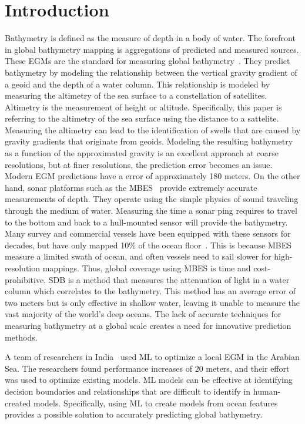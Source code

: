 \section{Introduction}
\setlength{\parindent}{10ex}
Bathymetry is defined as the measure of depth in a body of water.
The forefront in global bathymetry mapping is aggregations of predicted and measured sources. 
These \ac{EGM}s are the standard for measuring global bathymetry~\cite{becker2009global,smith1994bathymetric,smith1997global,smith2010planning}.
They predict bathymetry by modeling the relationship between the vertical gravity gradient of a geoid and the depth of a water column.
This relationship is modeled by measuring the altimetry of the sea surface to a constellation of satellites.
Altimetry is the measurement of height or altitude. 
Specifically, this paper is referring to the altimetry of the sea surface using the distance to a sattelite.
Measuring the altimetry can lead to the identification of swells that are caused by gravity gradients that originate from geoids.
Modeling the resulting bathymetry as a function of the approximated gravity is an excellent approach at coarse resolutions, but at finer resolutions, the prediction error becomes an issue.
Modern \ac{EGM} predictions have a error of approximately 180 meters.
On the other hand, sonar platforms such as the \ac{MBES}~\cite{farr1980multibeam} provide extremely accurate measurements of depth.
They operate using the simple physics of sound traveling through the medium of water.
Measuring the time a sonar ping requires to travel to the bottom and back to a hull-mounted sensor will provide the bathymetry.
Many survey and commercial vessels have been equipped with these sensors for decades, but have only mapped 10\% of the ocean floor~\cite{becker2009global}.
This is because \ac{MBES} measure a limited swath of ocean, and often vessels need to sail slower for high-resolution mappings.
Thus, global coverage using \ac{MBES} is time and cost-prohibitive.
\ac{SDB} is a method that measures the attenuation of light in a water column which correlates to the bathymetry.
This method has an average error of two meters but is only effective in shallow water, leaving it unable to measure the vast majority of the world's deep oceans.
The lack of accurate techniques for measuring bathymetry at a global scale creates a need for innovative prediction methods.

\par
A team of researchers in India~\cite{jena2012prediction} used \ac{ML} to optimize a local \ac{EGM} in the Arabian Sea.
The researchers found performance increases of 20 meters, and their effort was used to optimize existing models.
\ac{ML} models can be effective at identifying decision boundaries and relationships that are difficult to identify in human-created models.
Specifically, using \ac{ML} to create models from ocean features provides a possible solution to accurately predicting global bathymetry.

